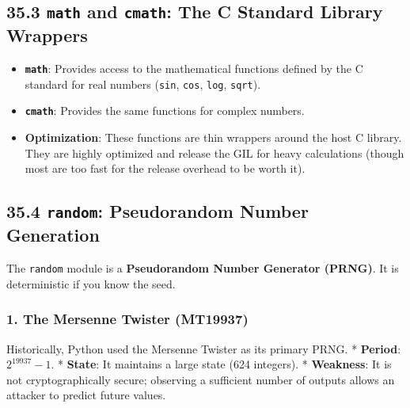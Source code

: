 \hypertarget{math-and-cmath-the-c-standard-library-wrappers}{%
\subsection{\texorpdfstring{35.3 \texttt{math} and \texttt{cmath}: The C
Standard Library
Wrappers}{35.3 math and cmath: The C Standard Library Wrappers}}\label{math-and-cmath-the-c-standard-library-wrappers}}

\begin{itemize}
\tightlist
\item
  \textbf{\passthrough{\lstinline!math!}}: Provides access to the
  mathematical functions defined by the C standard for real numbers
  (\passthrough{\lstinline!sin!}, \passthrough{\lstinline!cos!},
  \passthrough{\lstinline!log!}, \passthrough{\lstinline!sqrt!}).
\item
  \textbf{\passthrough{\lstinline!cmath!}}: Provides the same functions
  for complex numbers.
\item
  \textbf{Optimization}: These functions are thin wrappers around the
  host C library. They are highly optimized and release the GIL for
  heavy calculations (though most are too fast for the release overhead
  to be worth it).
\end{itemize}

\hypertarget{random-pseudorandom-number-generation}{%
\subsection{\texorpdfstring{35.4 \texttt{random}: Pseudorandom Number
Generation}{35.4 random: Pseudorandom Number Generation}}\label{random-pseudorandom-number-generation}}

The \passthrough{\lstinline!random!} module is a \textbf{Pseudorandom
Number Generator (PRNG)}. It is deterministic if you know the seed.

\hypertarget{the-mersenne-twister-mt19937}{%
\subsubsection{1. The Mersenne Twister
(MT19937)}\label{the-mersenne-twister-mt19937}}

Historically, Python used the Mersenne Twister as its primary PRNG. *
\textbf{Period}: \(2^{19937} - 1\). * \textbf{State}: It maintains a
large state (624 integers). * \textbf{Weakness}: It is not
cryptographically secure; observing a sufficient number of outputs
allows an attacker to predict future values.

